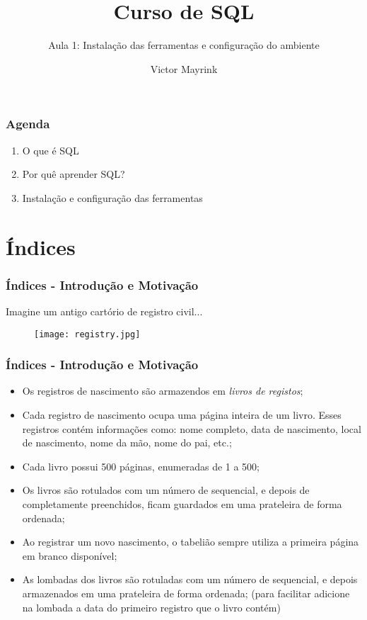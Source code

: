 \documentclass[t, 10pt, aspectratio=169, table, x11names]{beamer}
\begin{document}
	\author{Victor Mayrink}
	\title{Curso de SQL}
	\subtitle{Aula 1: Instalação das ferramentas e configuração do ambiente}

	\begin{frame}[plain]
		\maketitle
	\end{frame}

	\begin{frame}
		\frametitle{Agenda}
		\vspace{1cm}
		\begin{enumerate}
			\large
			\item O que é SQL
			\item Por quê aprender SQL?
			\item Instalação e configuração das ferramentas
		\end{enumerate}
	\end{frame}
	

	\section{Índices}

	\begin{frame}
		\frametitle{Índices - Introdução e Motivação}
		Imagine um antigo cartório de registro civil...
		\bigskip
		\begin{figure}[h]
			\centering
			\texttt{[image: registry.jpg]}
		\end{figure}
	\end{frame}

	\begin{frame}
		\frametitle{Índices - Introdução e Motivação}
		\begin{itemize}
			\item Os registros de nascimento são armazendos em \textit{livros de registos};
			\bigskip
			\item Cada registro de nascimento ocupa uma página inteira de um livro. Esses registros contém informações como: nome completo, data de nascimento, local de nascimento, nome da mão, nome do pai, etc.;
			\bigskip
			\item Cada livro possui 500 páginas, enumeradas de 1 a 500;
			\bigskip
			\item Os livros são rotulados com um número de sequencial, e depois de completamente preenchidos, ficam guardados em uma prateleira de forma ordenada;
			\bigskip
			\item Ao registrar um novo nascimento, o tabelião sempre utiliza a primeira página em branco disponível;
			\bigskip
			\item As lombadas dos livros são rotuladas com um número de sequencial, e depois armazenados em uma prateleira de forma ordenada; (para facilitar adicione na lombada a data do primeiro registro que o livro contém)
		\end{itemize}
	\end{frame}
\end{document}
